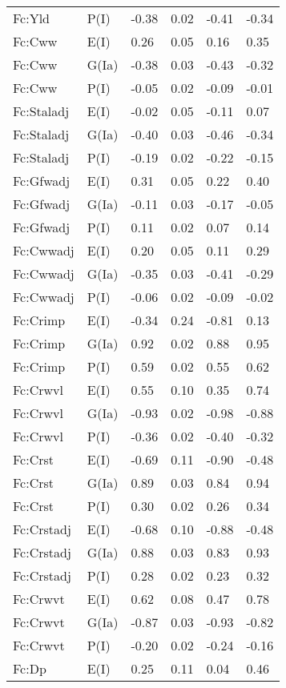 \begin{center}
\begin{longtable}{|p{1.1in}|p{0.7in}|p{0.7in}|p{0.6in}|p{0.6in}|p{0.6in}|}
  Fc:Yld & P(I) & -0.38 & 0.02 & -0.41 & -0.34 \\ 
  Fc:Cww & E(I) & 0.26 & 0.05 & 0.16 & 0.35 \\ 
  Fc:Cww & G(Ia) & -0.38 & 0.03 & -0.43 & -0.32 \\ 
  Fc:Cww & P(I) & -0.05 & 0.02 & -0.09 & -0.01 \\ 
  Fc:Staladj & E(I) & -0.02 & 0.05 & -0.11 & 0.07 \\ 
  Fc:Staladj & G(Ia) & -0.40 & 0.03 & -0.46 & -0.34 \\ 
  Fc:Staladj & P(I) & -0.19 & 0.02 & -0.22 & -0.15 \\ 
  Fc:Gfwadj & E(I) & 0.31 & 0.05 & 0.22 & 0.40 \\ 
  Fc:Gfwadj & G(Ia) & -0.11 & 0.03 & -0.17 & -0.05 \\ 
  Fc:Gfwadj & P(I) & 0.11 & 0.02 & 0.07 & 0.14 \\ 
  Fc:Cwwadj & E(I) & 0.20 & 0.05 & 0.11 & 0.29 \\ 
  Fc:Cwwadj & G(Ia) & -0.35 & 0.03 & -0.41 & -0.29 \\ 
  Fc:Cwwadj & P(I) & -0.06 & 0.02 & -0.09 & -0.02 \\ 
  Fc:Crimp & E(I) & -0.34 & 0.24 & -0.81 & 0.13 \\ 
  Fc:Crimp & G(Ia) & 0.92 & 0.02 & 0.88 & 0.95 \\ 
  Fc:Crimp & P(I) & 0.59 & 0.02 & 0.55 & 0.62 \\ 
  Fc:Crwvl & E(I) & 0.55 & 0.10 & 0.35 & 0.74 \\ 
  Fc:Crwvl & G(Ia) & -0.93 & 0.02 & -0.98 & -0.88 \\ 
  Fc:Crwvl & P(I) & -0.36 & 0.02 & -0.40 & -0.32 \\ 
  Fc:Crst & E(I) & -0.69 & 0.11 & -0.90 & -0.48 \\ 
  Fc:Crst & G(Ia) & 0.89 & 0.03 & 0.84 & 0.94 \\ 
  Fc:Crst & P(I) & 0.30 & 0.02 & 0.26 & 0.34 \\ 
  Fc:Crstadj & E(I) & -0.68 & 0.10 & -0.88 & -0.48 \\ 
  Fc:Crstadj & G(Ia) & 0.88 & 0.03 & 0.83 & 0.93 \\ 
  Fc:Crstadj & P(I) & 0.28 & 0.02 & 0.23 & 0.32 \\ 
  Fc:Crwvt & E(I) & 0.62 & 0.08 & 0.47 & 0.78 \\ 
  Fc:Crwvt & G(Ia) & -0.87 & 0.03 & -0.93 & -0.82 \\ 
  Fc:Crwvt & P(I) & -0.20 & 0.02 & -0.24 & -0.16 \\ 
  Fc:Dp & E(I) & 0.25 & 0.11 & 0.04 & 0.46 \\ 

\end{longtable}
\end{center}
